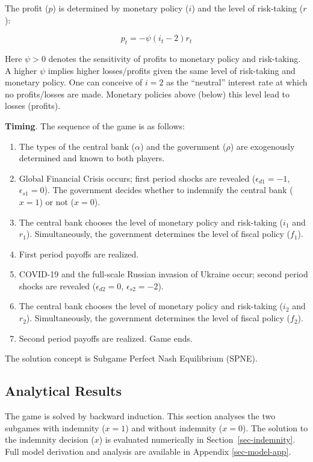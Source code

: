 \documentclass[
  a4paper,
  abstract=true]{scrartcl}
\theoremstyle{definition}
\begin{document}
The profit (\(p\)) is determined by monetary policy (\(i\)) and the
level of risk-taking (\(r\)):

\[
p_t =-\psi(i_t-2)r_t
\]

Here \(\psi>0\) denotes the sensitivity of profits to monetary policy
and risk-taking. A higher \(\psi\) implies higher losses/profits given
the same level of risk-taking and monetary policy. One can conceive of
\(i=2\) as the ``neutral'' interest rate at which no profits/losses are
made. Monetary policies above (below) this level lead to losses
(profits).

\textbf{Timing}. The sequence of the game is as follows:

\begin{enumerate}
\def\labelenumi{\arabic{enumi}.}
\item
  The types of the central bank (\(\alpha\)) and the government
  (\(\rho\)) are exogenously determined and known to both players.
\item
  Global Financial Crisis occurs; first period shocks are revealed
  (\(\epsilon_{d1}=-1\), \(\epsilon_{s1}=0\)). The government decides
  whether to indemnify the central bank (\(x=1\)) or not (\(x=0\)).
\item
  The central bank chooses the level of monetary policy and risk-taking
  (\(i_1\) and \(r_1\)). Simultaneously, the government determines the
  level of fiscal policy (\(f_1\)).
\item
  First period payoffs are realized.
\item
  COVID-19 and the full-scale Russian invasion of Ukraine occur; second
  period shocks are revealed (\(\epsilon_{d2}=0\),
  \(\epsilon_{s2}=-2\)).
\item
  The central bank chooses the level of monetary policy and risk-taking
  (\(i_2\) and \(r_2\)). Simultaneously, the government determines the
  level of fiscal policy (\(f_2\)).
\item
  Second period payoffs are realized. Game ends.
\end{enumerate}

The solution concept is Subgame Perfect Nash Equilibrium (SPNE).

\subsection{Analytical Results}\label{sec-analytical-main}

The game is solved by backward induction. This section analyses the two
subgames with indemnity (\(x=1\)) and without indemnity (\(x=0\)). The
solution to the indemnity decision (\(x\)) is evaluated numerically in
Section~\ref{sec-indemnity}. Full model derivation and analysis are
available in Appendix \ref{sec-model-app}.
\end{document}
